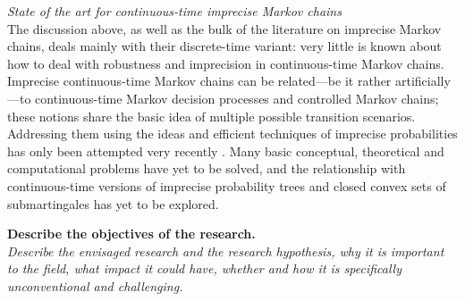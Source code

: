 \documentclass[11pt,dvipsnames,usenames,a4paper]{article}
\begin{document}
\emph{State of the art for continuous-time imprecise Markov chains}\\[5pt]
The discussion above, as well as the bulk of the literature on imprecise Markov chains, deals mainly with their discrete-time variant: very little is known about how to deal with robustness and imprecision in continuous-time Markov chains. 
Imprecise continuous-time Markov chains can be related---be it rather artificially---to continuous-time Markov decision processes and controlled Markov chains; these notions share the basic idea of multiple possible transition scenarios.
Addressing them using the ideas and efficient techniques of imprecise probabilities has only been attempted very recently \cite{skulj2015:continuous:bounds,Troffaes+GSB-ISIPTA15p,DeBock:2016:iCTMClimit,rottondi2017:flexigrid,erreygers2017:ictmcs}.
Many basic conceptual, theoretical and computational problems have yet to be solved, and the relationship with continuous-time versions of imprecise probability trees and closed convex sets of submartingales has yet to be explored.



\vspace{3mm}

\textbf{Describe the objectives of the research.}\\
\textit{Describe the envisaged research and the research hypothesis, why it is important to the field, what impact it could have, whether and how it is specifically unconventional and challenging.}
\end{document}

